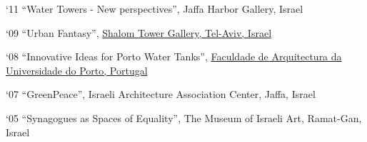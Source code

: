 \begin{tablist}
\item[`11] \tab \enquote{Water Towers - New perspectives}, Jaffa Harbor Gallery, Israel

\item[`09] \tab \enquote{Urban Fantasy},
\href{http://urbanica-il.blogspot.com/2009/09/blog-post_09.html}{Shalom Tower Gallery, Tel-Aviv, Israel}

\item[`08] \tab \enquote{Innovative Ideas for Porto Water Tanks},
\href{https://competitions.org/2007/06/innovative-ideas-for-porto-water-tanks/}{Faculdade de Arquitectura da Universidade do Porto, Portugal}

\item[`07] \tab \enquote{GreenPeace},
Israeli Architecture Association  Center, Jaffa, Israel

\item[`05] \tab \enquote{Synagogues as Spaces of Equality},
The Museum of Israeli Art, Ramat-Gan, Israel

\end{tablist}